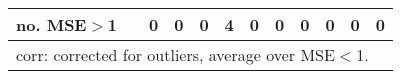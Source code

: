 {{\begin{sidewaystable}
\begin{tabular}{cc cc | cccc | cccc}
no. MSE$>$1 && 0 & 0 & 0 & 4 & 0 & 0 &0 & 0 & 0 & 0 \\[1ex] 
\hline 
\multicolumn{12}{l}{\footnotesize{corr: corrected for outliers, average over MSE$<$1.}}  \\ 
\end{tabular}
\label{tab:garch11_pcp_var}  
\end{sidewaystable}
}
}
